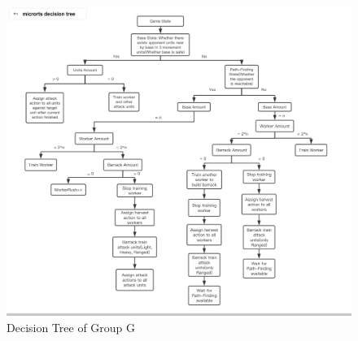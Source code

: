 \begin{figure}[htb]
    \centering
    \includegraphics[width=1\textwidth]{images/tree_of_group_g.png}
    \caption{Decision Tree of Group G}
    \label{figure:tree_of_group_g}
\end{figure}
